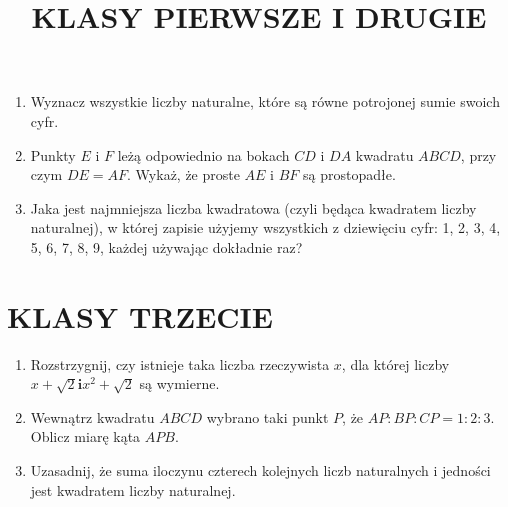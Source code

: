\documentclass[10pt]{article}
\title{KLASY PIERWSZE I DRUGIE }
\author{}
\date{}
\begin{document}
\maketitle
\begin{enumerate}
  \item Wyznacz wszystkie liczby naturalne, które są równe potrojonej sumie swoich cyfr.
  \item Punkty \(E\) i \(F\) leżą odpowiednio na bokach \(C D\) i \(D A\) kwadratu \(A B C D\), przy czym \(D E=A F\). Wykaż, że proste \(A E\) i \(B F\) są prostopadłe.
  \item Jaka jest najmniejsza liczba kwadratowa (czyli będąca kwadratem liczby naturalnej), w której zapisie użyjemy wszystkich z dziewięciu cyfr: 1, 2, 3, 4, 5, 6, 7, 8, 9, każdej używając dokładnie raz?
\end{enumerate}

\section*{KLASY TRZECIE}
\begin{enumerate}
  \item Rozstrzygnij, czy istnieje taka liczba rzeczywista \(x\), dla której liczby \(x+\sqrt{2} \mathbf{i} x^{2}+\sqrt{2}\) są wymierne.
  \item Wewnątrz kwadratu \(A B C D\) wybrano taki punkt \(P\), że \(A P: B P: C P=1: 2: 3\). Oblicz miarę kąta \(A P B\).
  \item Uzasadnij, że suma iloczynu czterech kolejnych liczb naturalnych i jedności jest kwadratem liczby naturalnej.
\end{enumerate}
\end{document}
